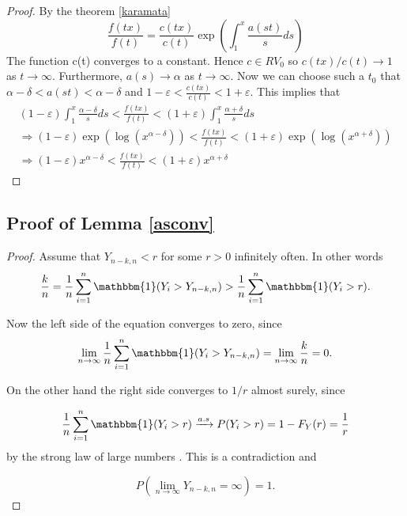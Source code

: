 \documentclass[english,12pt,a4paper,pdftex,sci,utf8]{aaltothesis} %
\begin{document}
\begin{proof}
By the theorem \ref{karamata}
\begin{equation*}
\frac{f(tx)}{f(t)}=\frac{c(tx)}{c(t)}\exp \left(\int_1^x \frac{a(st)}{s}ds \right)
\end{equation*}
The function c(t) converges to a constant. Hence $c \in RV_0$ so $c(tx)/c(t)\rightarrow 1$ as $t \rightarrow \infty$. Furthermore, $a(s) \rightarrow \alpha$ as $t \rightarrow \infty$. Now we can choose such a $t_0$ that $\alpha-\delta<a(st)<\alpha-\delta$ and $1-\varepsilon<\frac{c(tx)}{c(t)}<1+\varepsilon$. This implies that
\begin{equation*}
\begin{split}
(1-\varepsilon)\int_1^x \frac{\alpha-\delta}{s}ds<\frac{f(tx)}{f(t)}<(1+\varepsilon)\int_1^x \frac{\alpha+\delta}{s}ds \\
\Rightarrow (1-\varepsilon)\exp \left( \log \left( x^{\alpha-\delta} \right) \right)<\frac{f(tx)}{f(t)}<(1+\varepsilon)\exp \left( \log \left( x^{\alpha+\delta} \right) \right) \\
\Rightarrow (1-\varepsilon)x^{\alpha-\delta}<\frac{f(tx)}{f(t)}<(1+\varepsilon)x^{\alpha+\delta}
\end{split}
\end{equation*}
\end{proof}


\subsection{Proof of Lemma \ref{asconv}}

\begin{proof}
Assume that $Y_{n-k,n} < r$ for some $r > 0$ infinitely often. In other words
\begin{equation*}
\frac{k}{n} = \frac{1}{n} \sum_{i=1}^{n} \mathbbm{1}(Y_i>Y_{n-k,n}) > \frac{1}{n} \sum_{i=1}^{n} \mathbbm{1}(Y_i>r).
\end{equation*}

Now the left side of the equation converges to zero, since
\begin{equation*}
\lim_{n\to\infty} \frac{1}{n} \sum_{i=1}^{n} \mathbbm{1}(Y_i>Y_{n-k,n}) = \lim_{n\to\infty} \frac{k}{n} =0.
\end{equation*}

On the other hand the right side converges to $1/r$ almost surely, since

\begin{equation*}
\frac{1}{n} \sum_{i=1}^{n} \mathbbm{1}(Y_i>r) \xrightarrow{a.s} P(Y_i>r) = 1-F_Y(r) = \frac{1}{r}
\end{equation*}
by the strong law of large numbers \cite{rosenthal}. This is a contradiction and 

\begin{equation*}
P(\lim_{n\to\infty} Y_{n-k,n} = \infty)=1.
\end{equation*}
\end{proof}
\end{document}
